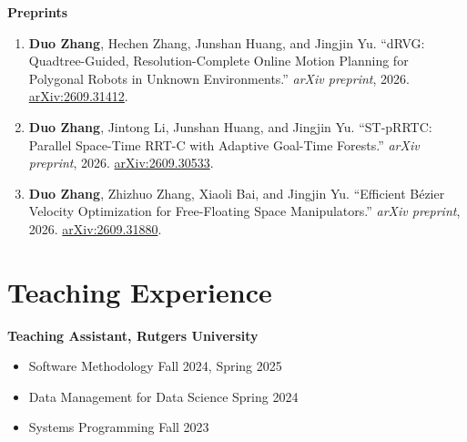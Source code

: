 \documentclass[11pt,letterpaper]{article}
\begin{document}
\textbf{Preprints}
\begin{enumerate}[resume]
  \item\label{pub:drvg} \textbf{Duo Zhang}, Hechen Zhang, Junshan Huang, and Jingjin Yu.
  ``dRVG: Quadtree-Guided, Resolution-Complete Online Motion Planning for
  Polygonal Robots in Unknown Environments.''
  \textit{arXiv preprint}, 2026.
  \href{https://arxiv.org/abs/2609.31412}{arXiv:2609.31412}.

  \item\label{pub:stprrtc} \textbf{Duo Zhang}, Jintong Li, Junshan Huang, and Jingjin Yu.
  ``ST-pRRTC: Parallel Space-Time RRT-C with Adaptive Goal-Time Forests.''
  \textit{arXiv preprint}, 2026.
  \href{https://arxiv.org/abs/2609.30533}{arXiv:2609.30533}.

  \item\label{pub:favor} \textbf{Duo Zhang}, Zhizhuo Zhang, Xiaoli Bai, and Jingjin Yu.
  ``Efficient B\'ezier Velocity Optimization for Free-Floating Space Manipulators.''
  \textit{arXiv preprint}, 2026.
  \href{https://arxiv.org/abs/2609.31880}{arXiv:2609.31880}.
\end{enumerate}

\section*{Teaching Experience}
\textbf{Teaching Assistant, Rutgers University}
\begin{itemize}
  \item Software Methodology \hfill Fall 2024, Spring 2025
  \item Data Management for Data Science \hfill Spring 2024
  \item Systems Programming \hfill Fall 2023
\end{itemize}
\end{document}
